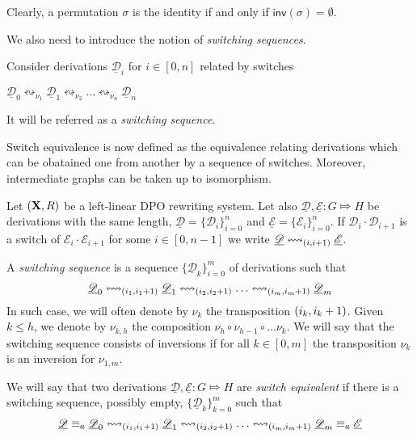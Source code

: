 \documentclass[a4paper,UKenglish,cleveref,pdftex, thm-restate,numberwithinsect,anonymous]{lipics}
\newcommand{\interval}[2][1]{\ensuremath{[{#1},{#2}]}}
\newcommand{\perm}{\sigma}
\def\R{\mathsf{R}}
\def\X{\textbf {\textup{X}}}
\newcommand{\dder}[1]{\mathscr{#1}}
\newcommand{\der}[1]{\underline{\dder{#1}}}
\newcommand{\inv}[1]{\mathsf{inv}({#1})}
\newcommand{\shift}[1]{\ensuremath{\mathrel{{\leftrightsquigarrow}_{#1}}}}
\begin{document}
\begin{remark}
	Clearly, a permutation $\perm$ is the identity if and only if $\inv{\perm}=\emptyset$.
\end{remark}



We also need to introduce the notion of \emph{switching sequences}.


\begin{definition}
	Consider derivations $\der{D}_i$ for $i \in \interval[0]{n}$
	related by switches
	\begin{center}
		$\der{D}_0 \shift{\nu_1} \der{D}_1 \shift{\nu_2} \ldots \shift{\nu_n}
		\der{D}_n$
	\end{center}
	It will be referred as a \emph{switching sequence}.  
\end{definition}

Switch equivalence is now defined as the equivalence relating derivations which can be obatained one from another by a sequence of switches. Moreover, intermediate graphs can be taken up to isomorphism.

\begin{definition}
  \label{de:switch-equivalence}
  Let $(\X, \R)$ be a left-linear DPO rewriting system.  Let also
  $\der{D}, \der{E} : G \Mapsto H$ be derivations with the same
  length, $\der{D}=\{\dder{D}_{i}\}_{i=0}^n$ and
  $\der{E}=\{\dder{E}_{i}\}_{i=0}^n$. If
  $\dder{D}_i \cdot \dder{D}_{i+1}$ is a switch of
  $\dder{E}_i \cdot \dder{E}_{i+1}$ for some $i \in [0,n-1]$ we write
  $\der{D} \shift{\transp{i}} \der{E}$. 
  
  A \emph{switching sequence} is  a sequence $\{\der{D}_{k}\}_{i=0}^m$ of derivations such that 
  \[\der{D}_0 \shift{\transp{i_1}} \der{D}_1 \shift{\transp{i_2}} \ldots \shift{\transp{i_m}}
  \der{D}_m\]
 In such case, we will often denote by $\nu_{k}$ the transposition $\transp{i_k}$. Given $k \leq h$,
 we denote by $\nu_{k,h}$ the composition
 $\nu_h \circ \nu_{h-1} \circ \ldots \nu_k$. We will say that the
 switching sequence consists of inversions if for all
 $k \in \interval[0]{m}$ the transposition $\nu_k$ is an inversion for
 $\nu_{1,m}$.
  
  We will say that two derivations $\der{D}, \der{E}:G\Mapsto H$ are \emph{switch
    equivalent} if there is a switching sequence, possibly empty, $\{\der{D}_{k}\}_{k=0}^m$ such that
      \[\der{D}\equiv_a \der{D}_0 \shift{\transp{i_1}} \der{D}_1 \shift{\transp{i_2}} \ldots \shift{\transp{i_m}}
    \der{D}_m\equiv _a \der{E}\]
\end{definition}
\end{document}
